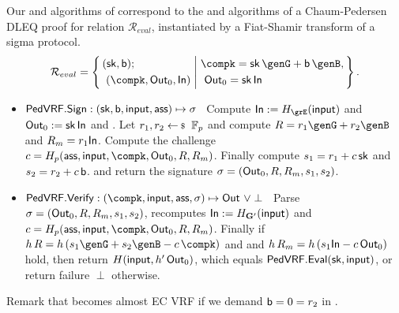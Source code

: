 Our \Sign and \Verify algorithms of \PedVRF correspond to
the \Prove and \Verify algorithms of a Chaum-Pedersen DLEQ proof
 for relation $\mathcal{R}_{eval}$,
instantiated by a Fiat-Shamir transform of a sigma protocol.
\vspace{-2mm}
$$ \mathcal{R}_{eval} = \Setst{
  \begin{aligned}
    & (\sk, \openpk); \\ 
    & \,\, (\compk,\PreOut,\In) 
  \end{aligned}
}{
  \begin{aligned}
    & \compk = \sk\,\genG + \openpk\,\genB, \\
    & \,\, \PreOut = \sk\,\In 
  \end{aligned}
}  \mathperiod \label{rel:commit} 
$$
%
\begin{itemize}
	\item ${\mathsf{PedVRF}}.{\mathsf{Sign}} : (\mathsf{sk},\mathsf{b},\mathsf{input},\mathsf{ass}) \mapsto \sigma$ \,
	Compute $\In := H_{\grE}(\msg)$ and ${\mathsf{Out}}_0 := \mathsf{sk} \, {\mathsf{In}}$ and \compk.
	Let $r_1,r_2 \leftsample \F_p$
	and compute $R = r_1 \genG + r_2 \genB$ and $R_m = r_1 {\mathsf{In}}$.
	Compute the challenge $c = H_p(\aux,\msg,\compk,\PreOut,R,R_m)$.
	Finally compute $s_1 = r_1 + c \, \mathsf{sk}$ and $s_2 = r_2 + c \, \mathsf{b}$.
	and return the signature $\sigma = ({\mathsf{Out}}_0,R,R_m,s_1,s_2)$.

	\item $\PedVRF.\Verify : (\compk,\msg,\aux,\sigma) \mapsto \Out \,\, \lor \perp$ \,
	Parse $\sigma = ({\mathsf{Out}}_0, R,R_m,s_1,s_2)$,
	recomputes ${\mathsf{In}} := H_{{\mathbf{G}'}}(\mathsf{input})$ and 
	$c = H_p(\aux,\msg,\compk,\PreOut,R,R_m)$.
    Finally if $h \, R = h \, (s_1 \genG + s_2 \genB - c \, \compk)$ and
    and $h \, R_m = h \, (s_1 {\mathsf{In}} - c \, {\mathsf{Out}}_0)$  hold,
    then return $H(\mathsf{input}, {h'}\,{\mathsf{Out}}_0)$, which equals ${\mathsf{PedVRF}}.{\mathsf{Eval}}(\mathsf{sk},\mathsf{input})$,
    or return failure $\perp$ otherwise.
\end{itemize}
Remark that \PedVRF becomes almost EC VRF if
 we demand $\mathsf{b} = 0 = r_2$ in \Sign.


